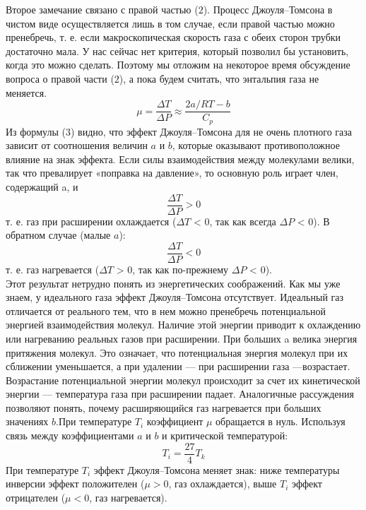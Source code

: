 \documentclass[12pt,a4paper]{article}
\begin{document}
	Второе замечание связано с правой частью ($2$). Процесс Джоуля–Томсона в чистом виде осуществляется лишь в том случае, если правой частью можно пренебречь, т. е. если макроскопическая скорость газа с обеих сторон трубки достаточно мала. У нас сейчас
нет критерия, который позволил бы установить, когда это можно сделать. Поэтому мы отложим на некоторое время обсуждение вопроса о правой части ($2$), а пока будем считать, что энтальпия газа не меняется.
	\begin{equation}
	\mu = \dfrac{\Delta T}{\Delta P} \approx \dfrac{2a/RT - b}{C_p} 
	\end{equation}
	Из формулы ($3$) видно, что эффект Джоуля–Томсона для не очень плотного газа зависит от соотношения величин $a$ и $b$, которые оказывают противоположное влияние на знак эффекта. Если силы взаимодействия между молекулами велики, так что превалирует «поправка на давление», то основную роль играет член, содержащий a, и
	\begin{equation*}
	\dfrac{\Delta T}{\Delta P} > 0
	\end{equation*}
	т. е. газ при расширении охлаждается ($\Delta T$ < 0, так как всегда $\Delta P$ < 0). В обратном случае (малые $a$):
	\begin{equation*}
	\dfrac{\Delta T}{\Delta P} < 0
	\end{equation*}
	т. е. газ нагревается ($\Delta T$ > 0, так как по-прежнему $\Delta P$ < 0). \\
	
	Этот результат нетрудно понять из энергетических соображений. Как мы уже знаем, у идеального газа эффект Джоуля–Томсона отсутствует. Идеальный газ отличается от реального тем, что в нем можно пренебречь потенциальной энергией взаимодействия молекул. Наличие этой энергии приводит к охлаждению или нагреванию реальных газов при расширении. При больших a велика энергия притяжения молекул. Это означает, что потенциальная энергия молекул при их
сближении уменьшается, а при удалении — при расширении газа —возрастает. Возрастание потенциальной энергии молекул происходит за счет их кинетической энергии — температура газа при расширении падает. Аналогичные рассуждения позволяют понять, почему расширяющийся газ нагревается при больших значениях $b$.При температуре $T_i $ коэффициент $\mu$ обращается в нуль. Используя связь между коэффициентами $a$ и $b$ и критической температурой:
	\begin{equation}
	T_i = \dfrac{27}{4}T_k
	\end{equation}
	При температуре $T_i$ эффект Джоуля–Томсона меняет знак: ниже температуры инверсии эффект положителен ($\mu > 0$, газ охлаждается), выше $T_i$ эффект отрицателен ($\mu < 0$, газ нагревается). \\
	
\end{document}
